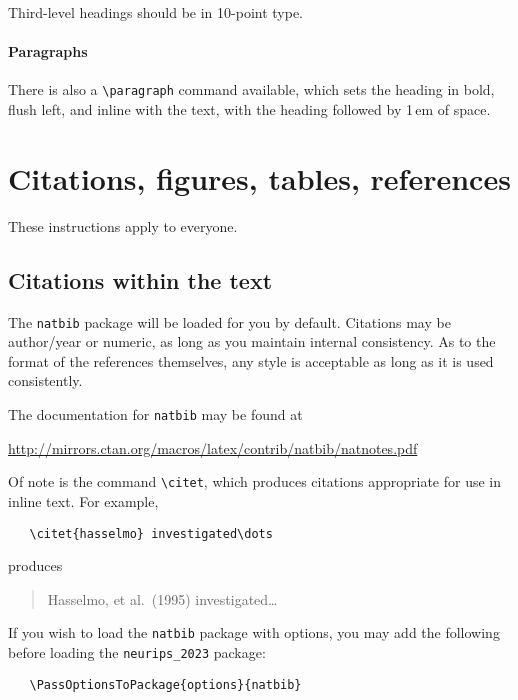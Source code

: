 \documentclass{article}
\begin{document}
Third-level headings should be in 10-point type.


\paragraph{Paragraphs}


There is also a \verb+\paragraph+ command available, which sets the heading in
bold, flush left, and inline with the text, with the heading followed by 1\,em
of space.


\section{Citations, figures, tables, references}
\label{others}


These instructions apply to everyone.


\subsection{Citations within the text}


The \verb+natbib+ package will be loaded for you by default.  Citations may be
author/year or numeric, as long as you maintain internal consistency.  As to the
format of the references themselves, any style is acceptable as long as it is
used consistently.


The documentation for \verb+natbib+ may be found at
\begin{center}
  \url{http://mirrors.ctan.org/macros/latex/contrib/natbib/natnotes.pdf}
\end{center}
Of note is the command \verb+\citet+, which produces citations appropriate for
use in inline text.  For example,
\begin{verbatim}
   \citet{hasselmo} investigated\dots
\end{verbatim}
produces
\begin{quote}
  Hasselmo, et al.\ (1995) investigated\dots
\end{quote}


If you wish to load the \verb+natbib+ package with options, you may add the
following before loading the \verb+neurips_2023+ package:
\begin{verbatim}
   \PassOptionsToPackage{options}{natbib}
\end{verbatim}
\end{document}
